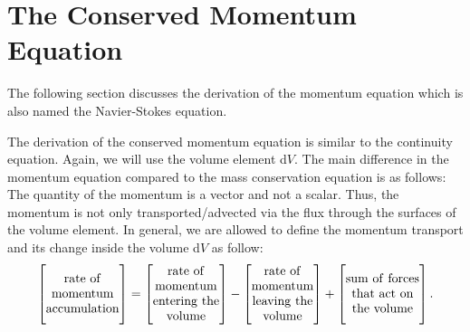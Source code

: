 \documentclass[MathematicsNumericsDerivationsAndOpenFOAM.tex]{subfiles}
\begin{document}


\section{The Conserved Momentum Equation}
\label{SECTION::momentum}
%
%
	The following section discusses the derivation of the momentum equation
    which is also named the Navier-Stokes equation.

	The derivation of the conserved momentum equation is similar to the
    continuity equation. Again, we will use the volume element d$V$. The main
    difference in the momentum equation compared to the mass conservation
    equation is as follows: The quantity of the momentum is a vector and
    not a scalar. Thus, the momentum is not only transported/advected via the
    flux through the surfaces of the volume element.
%
%
	In general, we are allowed to define the momentum transport and its change
    inside the volume d$V$ as follow:
%
%
\begin{equation}
\left[
 \vphantom{\begin{matrix} . \\ . \\ . \\ . \end{matrix}}
 \begin{matrix}
  \rmm{rate~of}\\
  \rmm{momentum}\\
  \rmm{accumulation}
 \end{matrix}
\right]
=
\left[
 \begin{matrix}
  \rmm{rate~of}\\
  \rmm{momentum}\\
  \rmm{entering~the}\\
  \rmm{volume}
 \end{matrix}
\right]
-
\left[
 \begin{matrix}
  \rmm{rate~of}\\
  \rmm{momentum}\\
  \rmm{leaving~the}\\
  \rmm{volume}
 \end{matrix}
\right]
+
\left[
 \vphantom{\begin{matrix} . \\ . \\ . \\ . \end{matrix}}
 \begin{matrix}
  \rmm{sum~of~forces}\\
  \rmm{that~act~on}\\
  \rmm{the~volume}
 \end{matrix}
\right] .
\label{EQUATION::momentum}
\end{equation}
\end{document}
